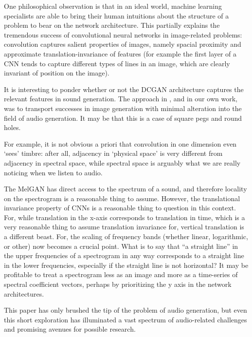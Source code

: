 One philosophical observation is that in an ideal world, machine learning specialists are able to bring their human intuitions about the structure of a problem to bear on the network architecture. This partially explains the tremendous success of convolutional neural networks in image-related problems: convolution captures salient properties of images, namely spacial proximity and approximate translation-invariance of features (for example the first layer of a CNN tends to capture different types of lines in an image, which are clearly invariant of position on the image).

It is interesting to ponder whether or not the DCGAN architecture captures the relevant features in sound generation. The approach in \cite{donahue2018adversarial}, and in our own work, was to transport successes in image generation with minimal alteration into the field of audio generation. It may be that this is a case of square pegs and round holes.

For example, it is not obvious a priori that convolution in one dimension even `sees' timbre: after all, adjacency in `physical space' is very different from adjacency in spectral space, while spectral space is arguably what we are really noticing when we listen to audio.

The MelGAN has direct access to the spectrum of a sound, and therefore locality on the spectrogram is a reasonable thing to assume. However, the translational invariance property of CNNs is a reasonable thing to question in this context. For, while translation in the x-axis corresponds to translation in time, which is a very reasonable thing to assume translation invariance for, vertical translation is a different beast. For, the scaling of frequency bands (whether linear, logarithmic, or other) now becomes a crucial point. What is to say that ``a straight line'' in the upper frequencies of a spectrogram in any way corresponds to a straight line in the lower frequencies, especially if the straight line is not horizontal? It may be profitable to treat a spectrogram less as an image and more as a time-series of spectral coefficient vectors, perhaps by prioritizing the y axis in the network architectures.

This paper has only brushed the tip of the problem of audio generation, but even this short exploration has illuminated a vast spectrum of audio-related challenges and promising avenues for possible research.